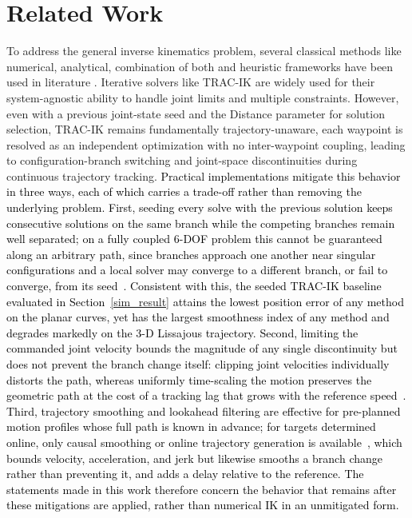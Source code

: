\documentclass[preprint,12pt]{elsarticle}
\begin{document}
\section{Related Work}
\label{related work}
To address the general inverse kinematics problem, several classical methods like numerical, analytical, combination of both and heuristic frameworks have been used in literature \cite{ABDORSIERRA2022100597}. Iterative solvers like TRAC-IK \cite{tracik} are widely used for their system-agnostic ability to handle joint limits and multiple constraints. However, even with a previous joint-state seed and the Distance parameter for solution selection, TRAC-IK remains fundamentally trajectory-unaware, each waypoint is resolved as an independent optimization with no inter-waypoint coupling, leading to configuration-branch switching and joint-space discontinuities during continuous trajectory tracking. \textcolor{black}{Practical implementations mitigate this behavior in three ways, each of which carries a trade-off rather than removing the underlying problem. First, seeding every solve with the previous solution keeps consecutive solutions on the same branch while the competing branches remain well separated; on a fully coupled 6-DOF problem this cannot be guaranteed along an arbitrary path, since branches approach one another near singular configurations and a local solver may converge to a different branch, or fail to converge, from its seed~\cite{tracik, dai2019global}. Consistent with this, the seeded TRAC-IK baseline evaluated in Section~\ref{sim_result} attains the lowest position error of any method on the planar curves, yet has the largest smoothness index of any method and degrades markedly on the 3-D Lissajous trajectory. Second, limiting the commanded joint velocity bounds the magnitude of any single discontinuity but does not prevent the branch change itself: clipping joint velocities individually distorts the path, whereas uniformly time-scaling the motion preserves the geometric path at the cost of a tracking lag that grows with the reference speed~\cite{faroni2018predictive}. Third, trajectory smoothing and lookahead filtering are effective for pre-planned motion profiles whose full path is known in advance; for targets determined online, only causal smoothing or online trajectory generation is available~\cite{kroger2010line, macfarlane2003jerk}, which bounds velocity, acceleration, and jerk but likewise smooths a branch change rather than preventing it, and adds a delay relative to the reference. The statements made in this work therefore concern the behavior that remains after these mitigations are applied, rather than numerical IK in an unmitigated form.}
\end{document}
